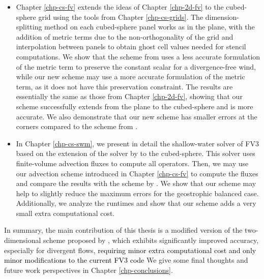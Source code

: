 \begin{itemize}
\item Chapter \ref{chp-cs-fv} extends the ideas of Chapter \ref{chp-2d-fv} to the cubed-sphere grid using the tools from Chapter \ref{chp-cs-grids}.
The dimension-splitting method on each cubed-sphere panel works as in the plane, 
with the addition of metric terms due to the non-orthogonality of the grid and interpolation between panels to obtain ghost cell values needed for stencil computations. 
We show that the scheme from \citet{putman:2007} uses a less accurate formulation of the metric term to preserve the constant scalar for a divergence-free wind,
while our new scheme may use a more accurate formulation of the metric term, as it does not have this preservation constraint. 
The results are essentially the same as those from Chapter \ref{chp-2d-fv}, 
showing that our scheme successfully extends from the plane to the cubed-sphere and is more accurate. 
We also demonstrate that our new scheme has smaller errors at the corners compared to the scheme from \citet{putman:2007}.

\item In Chapter \ref{chp-cs-swm}, we present in detail the shallow-water solver of FV3
based on the extension of the solver by \citet{lin:1997} to the cubed-sphere.
This solver uses finite-volume advection fluxes to compute all operators.
Then, we may use our advection scheme introduced in Chapter \ref{chp-cs-fv} 
to compute the fluxes and compare the results with the scheme by \citet{putman:2007}.
We show that our scheme may help to slightly reduce the maximum errors for the geostrophic balanced case.
Additionally, we analyze the runtimes and show that our scheme adds a very small extra computational cost.
\end{itemize}

In summary, the main contribution of this thesis is a modified version of the two-dimensional scheme proposed by \citet{putman:2007}, 
which exhibits significantly improved accuracy, especially for divergent flows,
\textcolor{black}{requiring minor extra computational cost and only minor modifications to the current FV3 code}
We give some final thoughts and future work perspectives in Chapter \ref{chp-conclusions}.